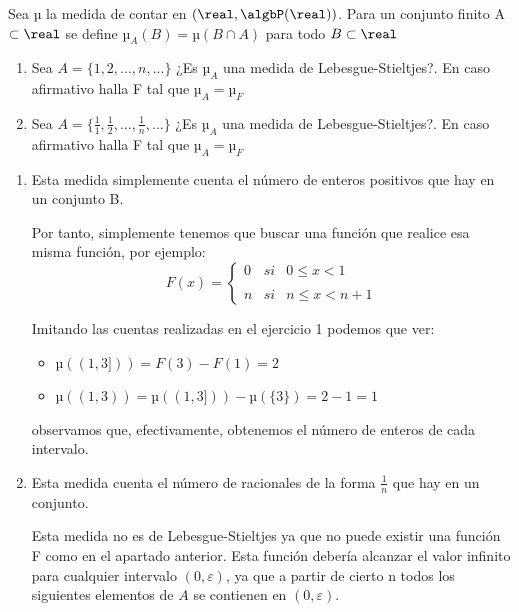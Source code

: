 \begin{problem}
Sea µ la medida de contar en $(\real, \algbP(\real))$. Para un conjunto finito A $\subset \real$ se define $µ_A(B) = µ(B \cap A)$ para todo $B \subset \real$

\begin{enumerate}
\item Sea $A=\{1,2,...,n,...\}$ ¿Es $µ_A$ una medida de Lebesgue-Stieltjes?. En caso afirmativo halla F tal que $µ_A=µ_F$
\item Sea $A=\{\frac{1}{1},\frac{1}{2},...,\frac{1}{n},...\}$ ¿Es $µ_A$ una medida de Lebesgue-Stieltjes?. En caso afirmativo halla F tal que $µ_A=µ_F$
\end{enumerate}

\solution

\begin{enumerate}
\item Esta medida simplemente cuenta el número de enteros positivos que hay en un conjunto B.

Por tanto, simplemente tenemos que buscar una función que realice esa misma función, por ejemplo:
\[F(x)=\left\{ \begin{array}{lcc}
             0 &   si  & 0 \leq x < 1 \\
             \\ n &  si  & n \leq x < n+1
             \end{array}
   \right.\]

Imitando las cuentas realizadas en el ejercicio 1 podemos que ver:
\begin{itemize}
\item $µ((1,3])) = F(3) - F(1) = 2$
\item $µ((1,3)) = µ((1,3])) - µ(\{3\}) = 2 - 1 = 1$
\end{itemize}
observamos que, efectivamente, obtenemos el número de enteros de cada intervalo.

\item Esta medida cuenta el número de racionales de la forma $\frac{1}{n}$ que hay en un conjunto.

Esta medida no es de Lebesgue-Stieltjes ya que no puede existir una función F como en el apartado anterior. Esta función debería alcanzar el valor infinito para cualquier intervalo $(0, ε)$, ya que a partir de cierto n todos los siguientes elementos de $A$ se contienen en $(0, ε)$.

\end{enumerate}
\end{problem}

